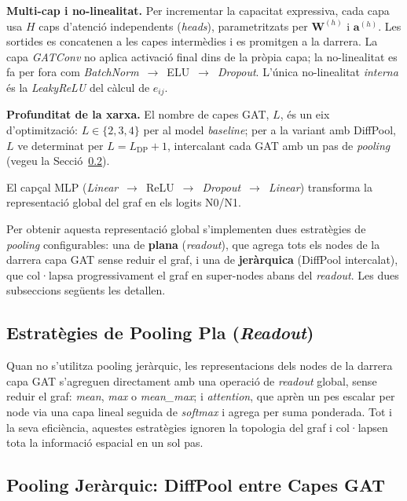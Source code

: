 \documentclass[10pt,a4paper,twocolumn,twoside]{article}
\begin{document}
\textbf{Multi-cap i no-linealitat.} Per incrementar la capacitat expressiva, cada capa usa $H$ caps
d'atenció independents (\textit{heads}), parametritzats per $\mathbf{W}^{(h)}$ i $\mathbf{a}^{(h)}$.
Les sortides es concatenen a les capes intermèdies i es promitgen a la darrera. La capa
\textit{GATConv} no aplica activació final dins de la pròpia capa; la no-linealitat es fa per fora
com \textit{BatchNorm}~$\to$~ELU~$\to$~\textit{Dropout}. L'única no-linealitat \textit{interna} és
la \textit{LeakyReLU} del càlcul de $e_{ij}$.

\textbf{Profunditat de la xarxa.} El nombre de capes GAT, $L$, és un eix d'optimització: $L \in \{2,3,4\}$
per al model \textit{baseline}; per a la variant amb DiffPool, $L$ ve determinat per
$L = L_{\text{DP}} + 1$, intercalant cada GAT amb un pas de \textit{pooling}
(vegeu la Secció~\ref{subsec:diffpool}).

El capçal MLP (\textit{Linear}~$\to$~ReLU~$\to$~\textit{Dropout}~$\to$~\textit{Linear}) transforma la
representació global del graf en els logits N0/N1.

Per obtenir aquesta representació global s'implementen dues estratègies de \textit{pooling}
configurables: una de \textbf{plana} (\textit{readout}), que agrega tots els nodes de la darrera
capa GAT sense reduir el graf, i una de \textbf{jeràrquica} (DiffPool intercalat), que col·lapsa
progressivament el graf en super-nodes abans del \textit{readout}. Les dues subseccions següents
les detallen.

\subsection{Estratègies de Pooling Pla (\textit{Readout})}

Quan no s'utilitza pooling jeràrquic, les representacions dels nodes de la darrera capa GAT
s'agreguen directament amb una operació de \textit{readout} global, sense reduir el graf:
\textit{mean}, \textit{max} o \textit{mean\_max}; i \textit{attention},
que aprèn un pes escalar per node via una capa lineal seguida de \textit{softmax} i agrega per
suma ponderada. Tot i la seva eficiència, aquestes estratègies ignoren la topologia del graf
i col·lapsen tota la informació espacial en un sol pas.

\subsection{Pooling Jeràrquic: DiffPool entre Capes GAT}
\label{subsec:diffpool}
\end{document}
